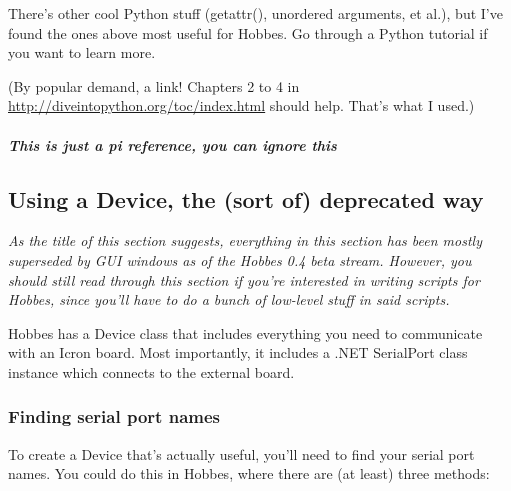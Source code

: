 There's other cool Python stuff (getattr(), unordered arguments, et al.), but I've found the ones above most useful for Hobbes. Go through a Python tutorial if you want to learn more.

(By popular demand, a link! Chapters 2 to 4 in \url{http://diveintopython.org/toc/index.html} should help. That's what I used.)

\setcounter{paragraph}{1}
\setcounter{subparagraph}{4}
\subparagraph{This is just a pi reference, you can ignore this}
\label{3.1.4.1.5}



%
%
\subsection{Using a Device, the (sort of) deprecated way}
\label{3.2}

\emph{As the title of this section suggests, everything in this section has been mostly superseded by GUI windows as of the Hobbes 0.4 beta stream. However, you should still read through this section if you're interested in writing scripts for Hobbes, since you'll have to do a bunch of low-level stuff in said scripts.}

Hobbes has a Device class that includes everything you need to communicate with an Icron board. Most importantly, it includes a .NET SerialPort class instance which connects to the external board.

\setcounter{subsubsection}{-1}



%
%
\subsubsection{Finding serial port names}
\label{3.2.0}

To create a Device that's actually useful, you'll need to find your serial port names. You could do this in Hobbes, where there are (at least) three methods:

